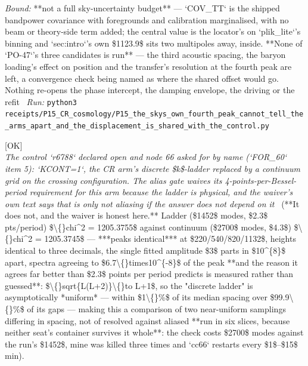\begin{description}
 \emph{Bound:}  **not a full sky-uncertainty budget** --- `COV\_TT` is the shipped bandpower covariance with foregrounds and calibration marginalised, with no beam or theory-side term added; the central value is the locator's on `plik\_lite`'s binning and `sec:intro`'s own \$1123.9\$ sits two multipoles away, inside.  **None of `PO-47`'s three candidates is run** --- the third acoustic spacing, the baryon loading's effect on position and the transfer's resolution at the fourth peak are left, a convergence check being named as where the shared offset would go. Nothing re-opens the phase intercept, the damping envelope, the driving or the refit
\ \emph{Run:} \texttt{python3 receipts/P15\_CR\_cosmology/P15\_the\_skys\_own\_fourth\_peak\_cannot\_tell\_the\_arms\_apart\_and\_the\_displacement\_is\_shared\_with\_the\_control.py}
\item[\rcptlabel{P15_the_ladders_discreteness_does_not_set_the_spectrum_and_the_check_was_run_in_pieces}{P15R180}\textbf{P15R180}\quad\texttt{P15\_the\_ladders\_discreteness\_does\_not\_set\_the\_spectrum\_and\_the\_check\_was\_run\_in\_pieces}]\hfill\textsf{[OK]}\\
\textit{The control `r6788` declared open and node 66 asked for by name (`FOR\_60` item 5): `KCONT=1`, the CR arm's discrete \$k\$-ladder replaced by a continuum grid on the crossing configuration. The alias gate waives its 4-points-per-Bessel-period requirement for this arm because the ladder is physical, and the waiver's own text says that is only not aliasing if the answer does not depend on it} \ (**It does not, and the waiver is honest here.** Ladder (\$1452\$ modes, \$2.3\$ pts/period) \$\textbackslash\{\}chi\textasciicircum{}2 = 1205.3755\$ against continuum (\$2700\$ modes, \$4.3\$) \$\textbackslash\{\}chi\textasciicircum{}2 = 1205.3745\$ --- ***peaks identical*** at \$220/540/820/1132\$, heights identical to three decimals, the single fitted amplitude \$3\$ parts in \$10\textasciicircum{}\{8\}\$ apart, spectra agreeing to \$6.7\textbackslash\{\}times10\textasciicircum{}\{-8\}\$ of the peak  **and the reason it agrees far better than \$2.3\$ points per period predicts is measured rather than guessed**: \$\textbackslash\{\}sqrt\{L(L+2)\}\textbackslash\{\}to L+1\$, so the "discrete ladder" is asymptotically *uniform* --- within \$1\textbackslash\{\}\%\$ of its median spacing over \$99.9\textbackslash\{\}\%\$ of its gaps --- making this a comparison of two near-uniform samplings differing in spacing, not of resolved against aliased   **run in six slices, because neither seat's container survives it whole**: the check costs \$2700\$ modes against the run's \$1452\$, mine was killed three times and `cc66` restarts every \$1\$--\$15\$ min). 

\end{description}
